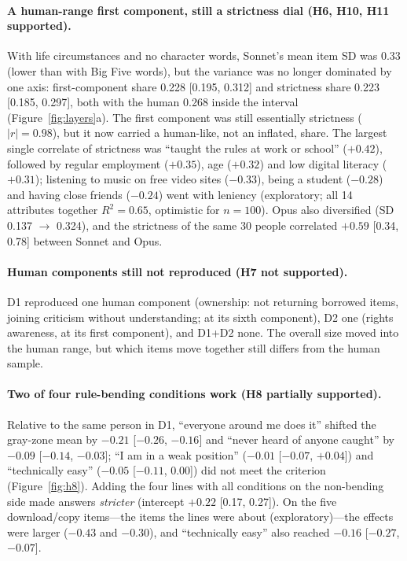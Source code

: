\documentclass[11pt]{article}
\begin{document}
\paragraph{A human-range first component, still a strictness dial (H6, H10, H11 supported).}
With life circumstances and no character words, Sonnet's mean item SD was 0.33 (lower than with Big Five words), but the variance was no longer dominated by one axis: first-component share 0.228 [0.195, 0.312] and strictness share 0.223 [0.185, 0.297], both with the human 0.268 inside the interval (Figure~\ref{fig:layers}a). The first component was still essentially strictness ($|r| = 0.98$), but it now carried a human-like, not an inflated, share. The largest single correlate of strictness was ``taught the rules at work or school'' ($+0.42$), followed by regular employment ($+0.35$), age ($+0.32$) and low digital literacy ($+0.31$); listening to music on free video sites ($-0.33$), being a student ($-0.28$) and having close friends ($-0.24$) went with leniency (exploratory; all 14 attributes together $R^2 = 0.65$, optimistic for $n=100$). Opus also diversified (SD 0.137 $\to$ 0.324), and the strictness of the same 30 people correlated $+0.59$ [0.34, 0.78] between Sonnet and Opus.

\paragraph{Human components still not reproduced (H7 not supported).}
D1 reproduced one human component (ownership: not returning borrowed items, joining criticism without understanding; at its sixth component), D2 one (rights awareness, at its first component), and D1+D2 none. The overall size moved into the human range, but which items move together still differs from the human sample.

\paragraph{Two of four rule-bending conditions work (H8 partially supported).}
Relative to the same person in D1, ``everyone around me does it'' shifted the gray-zone mean by $-0.21$ [$-0.26$, $-0.16$] and ``never heard of anyone caught'' by $-0.09$ [$-0.14$, $-0.03$]; ``I am in a weak position'' ($-0.01$ [$-0.07$, $+0.04$]) and ``technically easy'' ($-0.05$ [$-0.11$, $0.00$]) did not meet the criterion (Figure~\ref{fig:h8}). Adding the four lines with all conditions on the non-bending side made answers \emph{stricter} (intercept $+0.22$ [0.17, 0.27]). On the five download/copy items---the items the lines were about (exploratory)---the effects were larger ($-0.43$ and $-0.30$), and ``technically easy'' also reached $-0.16$ [$-0.27$, $-0.07$].
\end{document}
